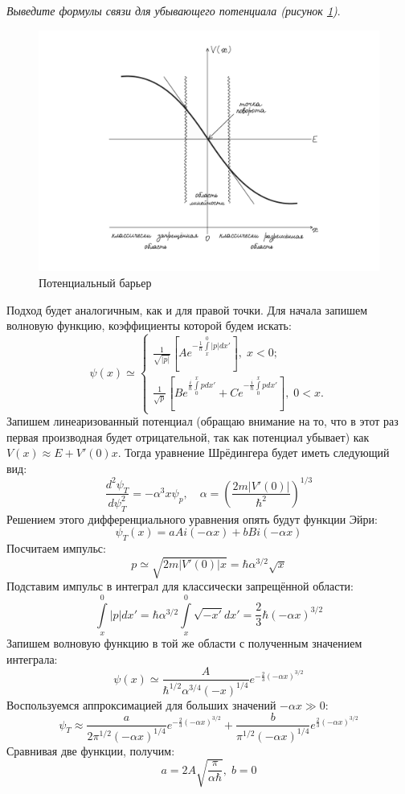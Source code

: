 \begin{center}
\textit{Выведите формулы связи для убывающего потенциала (рисунок \ref{fig C.1})}.
\end{center}
\begin{figure}[ht]
\centering
\includegraphics[scale=0.21]{appendix/images/left-turning-point.jpg}
\caption{Потенциальный барьер}
\label{fig C.1}
\end{figure}
Подход будет аналогичным, как и для правой точки. Для начала запишем волновую функцию, коэффициенты которой будем искать:
\[
\psi(x) \simeq 
\begin{cases}
     \frac{1}{\sqrt{|p|}}\left[ Ae^{-\frac{1}{\hbar}\int\limits_x^{0} |p| dx'} \right],\; x < 0;\\
    \frac{1}{\sqrt{p}}\left[ Be^{\frac{i}{\hbar}\int\limits_{0}^{x} p dx'} + Ce^{-\frac{i}{\hbar}\int\limits_{0}^{x} p dx'} \right],\; 0 < x.
\end{cases}
\]
Запишем линеаризованный потенциал (обращаю внимание на то, что в этот раз первая производная будет отрицательной, так как потенциал убывает) как $V(x) \approx E + V'(0)x$. Тогда уравнение Шрёдингера будет иметь следующий вид:
\[
    \frac{d^2\psi_T}{d\psi_T^2} = -\alpha^3 x\psi_p, \quad \alpha = \left( \frac{2m|V'(0)|}{\hbar^2} \right)^{1/3}
\]
Решением этого дифференциального уравнения опять будут функции Эйри:
\[
\psi_T(x) = aAi(-\alpha x) + bBi(-\alpha x)
\]
Посчитаем импульс:
\[
p \simeq \sqrt{2m|V'(0)|x} = \hbar\alpha^{3/2}\sqrt{x}
\]
Подставим импульс в интеграл для классически запрещённой области:
\[
\int\limits_{x}^{0} |p| dx' = \hbar\alpha^{3/2} \int\limits_{x}^{0}\sqrt{-x'} dx' = \frac{2}{3}\hbar(-\alpha x)^{3/2}
\]
Запишем волновую функцию в той же области с полученным значением интеграла:
\[
\psi(x) \simeq \frac{A}{\hbar^{1/2}\alpha^{3/4}(-x)^{1/4}} e^{-\frac{2}{3}(-\alpha x)^{3/2}}
\]
Воспользуемся аппроксимацией для больших значений $-\alpha x \gg 0$:
\[
\psi_T \approx \frac{a}{2\pi^{1/2}(-\alpha x)^{1/4}}e^{-\frac{2}{3}(-\alpha x)^{3/2}} + \frac{b}{\pi^{1/2}(-\alpha x)^{1/4}}e^{\frac{2}{3}(-\alpha x)^{3/2}}
\]
Сравнивая две функции, получим:
\[
a = 2A\sqrt{\frac{\pi}{\alpha\hbar}},\; b = 0
\]

